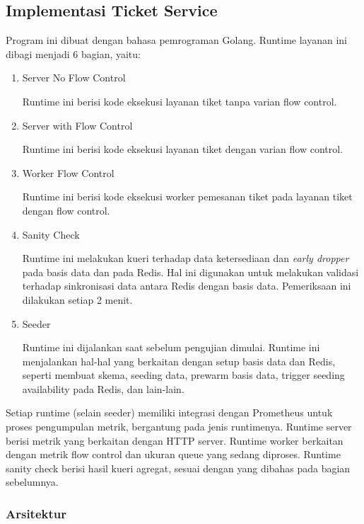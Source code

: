 \subsection{Implementasi Ticket Service}

Program ini dibuat dengan bahasa pemrograman Golang. Runtime layanan ini dibagi menjadi 6 bagian, yaitu:

\begin{enumerate}
      \item Server No Flow Control

            Runtime ini berisi kode eksekusi layanan tiket tanpa varian flow control.

      \item Server with Flow Control

            Runtime ini berisi kode eksekusi layanan tiket dengan varian flow control.

      \item Worker Flow Control

            Runtime ini berisi kode eksekusi worker pemesanan tiket pada layanan tiket dengan flow control.

      \item Sanity Check

            Runtime ini melakukan kueri terhadap data ketersediaan dan \textit{early dropper} pada basis data dan pada Redis. Hal ini digunakan untuk melakukan validasi terhadap sinkronisasi data antara Redis dengan basis data. Pemeriksaan ini dilakukan setiap 2 menit.

      \item Seeder

            Runtime ini dijalankan saat sebelum pengujian dimulai. Runtime ini menjalankan hal-hal yang berkaitan dengan setup basis data dan Redis, seperti membuat skema, seeding data, prewarm basis data, trigger seeding availability pada Redis, dan lain-lain.

\end{enumerate}

Setiap runtime (selain seeder) memiliki integrasi dengan Prometheus untuk proses pengumpulan metrik, bergantung pada jenis runtimenya. Runtime server berisi metrik yang berkaitan dengan HTTP server. Runtime worker berkaitan dengan metrik flow control dan ukuran queue yang sedang diproses. Runtime sanity check berisi hasil kueri agregat, sesuai dengan yang dibahas pada bagian sebelumnya.

\subsubsection{Arsitektur}

